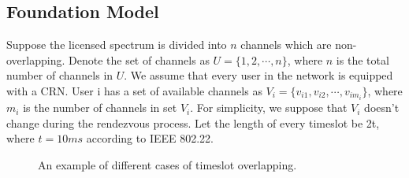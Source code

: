 \documentclass[10pt, conference, letterpaper]{IEEEtran}
\begin{document}
\subsection{Foundation Model}
 Suppose the licensed spectrum is divided into $n$ channels which are non-overlapping. Denote the set of channels as $U=\{1,2,\cdots,n\}$, where $n$ is the total number of channels in $U$. We assume that every user in the network is equipped with a CRN. User i has a set of available channels as $V_i = \{v_{i1},v_{i2},\cdots,v_{im_i}\}$, where $m_i$ is the number of channels in set $V_i$. For simplicity, we suppose that $V_i$ doesn't change during the rendezvous process. Let the length of every timeslot be 2t, where $t=10ms$ according to IEEE 802.22.

\begin{figure}
\centering
{}
\caption{An example of different cases of timeslot overlapping.}
\label{overlap}
\end{figure}
\end{document}
